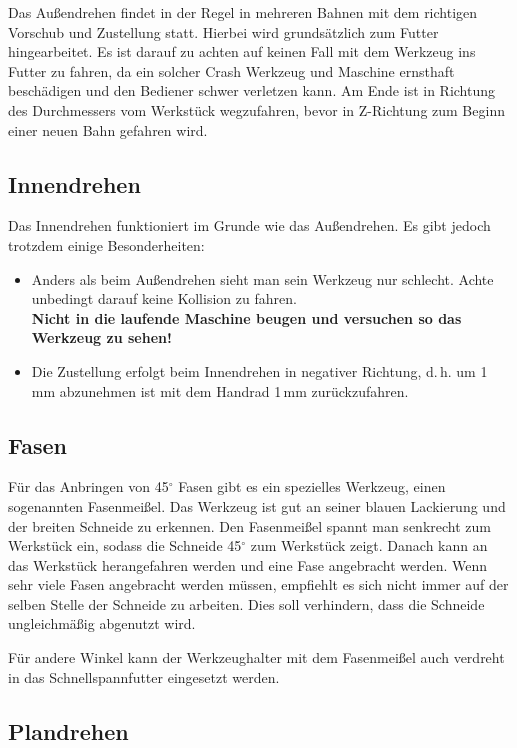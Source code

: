 \documentclass{\basedir/fablab-document}
\begin{document}
Das Außendrehen findet in der Regel in mehreren Bahnen mit dem richtigen Vorschub und Zustellung statt.
Hierbei wird grundsätzlich zum Futter hingearbeitet.
Es ist darauf zu achten auf keinen Fall mit dem Werkzeug ins Futter zu fahren, da ein solcher Crash Werkzeug und Maschine ernsthaft beschädigen und den Bediener schwer verletzen kann.
Am Ende ist in Richtung des Durchmessers vom Werkstück wegzufahren, bevor in Z-Richtung zum Beginn einer neuen Bahn gefahren wird.

\subsection{Innendrehen}

Das Innendrehen funktioniert im Grunde wie das Außendrehen. Es gibt jedoch trotzdem einige Besonderheiten:
\begin{itemize}
\item Anders als beim Außendrehen sieht man sein Werkzeug nur schlecht. Achte unbedingt darauf keine Kollision zu fahren.\\
\textbf{Nicht in die laufende Maschine beugen und versuchen so das Werkzeug zu sehen!}
\item Die Zustellung erfolgt beim Innendrehen in negativer Richtung, d.\,h. um 1\,mm abzunehmen ist mit dem Handrad 1\,mm zurückzufahren.
\end{itemize}

\subsection{Fasen}

Für das Anbringen von 45$^\circ$ Fasen gibt es ein spezielles Werkzeug, einen sogenannten Fasenmeißel.
Das Werkzeug ist gut an seiner blauen Lackierung und der breiten Schneide zu erkennen.
Den Fasenmeißel spannt man senkrecht zum Werkstück ein, sodass die Schneide 45$^\circ$ zum Werkstück zeigt.
Danach kann an das Werkstück herangefahren werden und eine Fase angebracht werden.
Wenn sehr viele Fasen angebracht werden müssen, empfiehlt es sich nicht immer auf der selben Stelle der Schneide zu arbeiten.
Dies soll verhindern, dass die Schneide ungleichmäßig abgenutzt wird.

Für andere Winkel kann der Werkzeughalter mit dem Fasenmeißel auch verdreht in das Schnellspannfutter eingesetzt werden.

\subsection{Plandrehen}
\label{handdrehen:Plandrehen}
\end{document}
